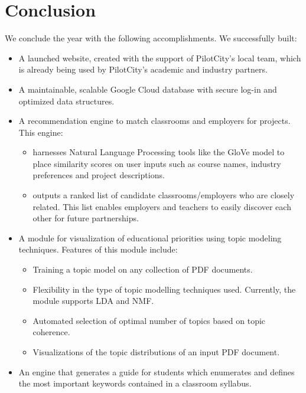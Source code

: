 
\chapter{Conclusion}%
\label{sec:typesetting}

We conclude the year with the following accomplishments. We successfully built:

\begin{itemize}
    \item A launched website, created with the support of PilotCity's local team, which is already being used by PilotCity's academic and industry partners. 
    \item A maintainable, scalable Google Cloud database with secure log-in and optimized data structures.
    \item A recommendation engine to match classrooms and employers for projects. This engine: 
    \begin{itemize}
        \item harnesses Natural Language Processing tools like the GloVe model to place similarity scores on user inputs such as course names, industry preferences and project descriptions.
        \item outputs a ranked list of candidate classrooms/employers who are closely related. This list enables employers and teachers to easily discover each other for future partnerships.
    \end{itemize} 

    \item A module for visualization of educational priorities using topic modeling techniques. Features of this module include:
    \begin{itemize}
        \item Training a topic model on any collection of PDF documents. 
        \item Flexibility in the type of topic modelling techniques used. Currently, the module supports LDA and NMF. 
        \item Automated selection of optimal number of topics based on topic coherence.
        \item Visualizations of the topic distributions of an input PDF document. 
         
    \end{itemize}
    \item An engine that generates a guide for students which enumerates and defines the most important keywords contained in a classroom syllabus.  
\end{itemize}

